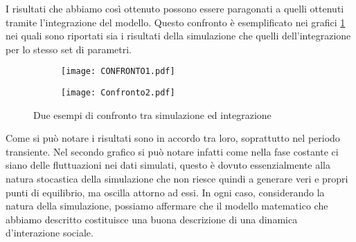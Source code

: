 I risultati che abbiamo così ottenuto possono essere paragonati a quelli ottenuti tramite l'integrazione del modello. Questo confronto è esemplificato nei grafici \ref{confromto} nei quali sono riportati sia i risultati della simulazione che quelli dell'integrazione per lo stesso set di parametri.\\ 
\begin{figure}[H]
	\centering
	\begin{subfigure}[H]{0.49\textwidth}
		\centering
		\texttt{[image: CONFRONTO1.pdf]}
	\end{subfigure}
	\hfill
	\begin{subfigure}[H]{0.49\textwidth}
		\centering
		\texttt{[image: Confronto2.pdf]}
	\end{subfigure}
	\caption{Due esempi di confronto tra simulazione ed integrazione}
	\label{confromto}
\end{figure}
Come si può notare i risultati sono in accordo tra loro, soprattutto nel periodo transiente. Nel secondo grafico si può notare infatti come nella fase costante ci siano delle fluttuazioni nei dati simulati, questo è dovuto essenzialmente alla natura stocastica della simulazione che non riesce quindi a generare veri e propri punti di equilibrio, ma oscilla attorno ad essi. In ogni caso, considerando la natura della simulazione, possiamo affermare che il modello matematico che abbiamo descritto costituisce una buona descrizione di una dinamica d'interazione sociale.
